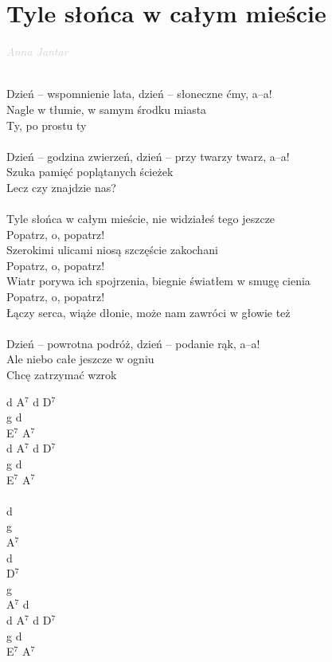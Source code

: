 \documentclass[a5paper, 10pt]{book}
\begin{document}
\newpage
\section{Tyle słońca w całym mieście}\textcolor{lightgray}{\textit{Anna Jantar
}}\\~\\
\begin{minipage}[t]{0.8\textwidth}
Dzień – wspomnienie lata, dzień – słoneczne ćmy, a–a!\\
Nagle w tłumie, w samym środku miasta\\
Ty, po prostu ty\\
\\
Dzień – godzina zwierzeń, dzień – przy twarzy twarz, a–a!\\
Szuka pamięć poplątanych ścieżek\\
Lecz czy znajdzie nas?\\
\\
Tyle słońca w całym mieście, nie widziałeś tego jeszcze\\
Popatrz, o, popatrz!\\
Szerokimi ulicami niosą szczęście zakochani\\
Popatrz, o, popatrz!\\
Wiatr porywa ich spojrzenia, biegnie światłem w smugę cienia\\
Popatrz, o, popatrz!\\
Łączy serca, wiąże dłonie, może nam zawróci w głowie też\\
\\
Dzień – powrotna podróż, dzień – podanie rąk, a–a!\\
Ale niebo całe jeszcze w ogniu\\
Chcę zatrzymać wzrok\\
\end{minipage}
\begin{minipage}[t]{0.2\textwidth}
d A$^7$ d D$^7$\\
g d\\
E$^7$ A$^7$\\

d A$^7$ d D$^7$\\
g d\\
E$^7$ A$^7$\\
\\
d\\
g\\
A$^7$\\
d\\
D$^7$\\
g\\
A$^7$ d\\

d A$^7$ d D$^7$\\
g d\\
E$^7$ A$^7$\\

\end{minipage}
\end{document}
